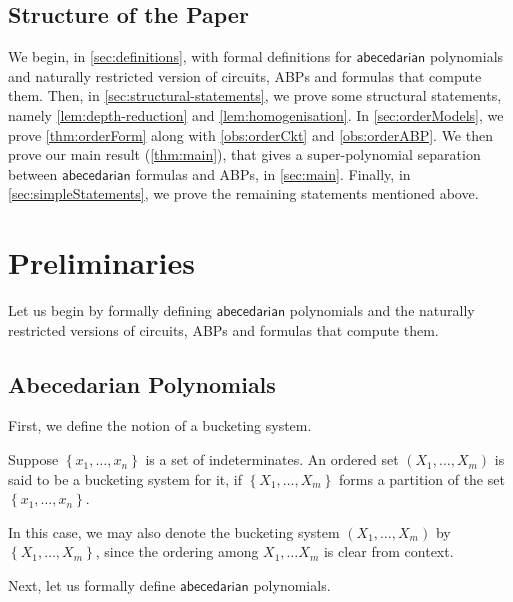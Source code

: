 \documentclass[10pt,a4paper]{article}
\def\set#1{\left\{ #1 \right\}}
\newcommand{\abcd}{\mathsf{abecedarian}}
\begin{document}
\subsection{Structure of the Paper}

We begin, in \autoref{sec:definitions}, with formal definitions for $\abcd$ polynomials and naturally restricted version of circuits, ABPs and formulas that compute them.
Then, in \autoref{sec:structural-statements}, we prove some structural statements, namely \autoref{lem:depth-reduction} and \autoref{lem:homogenisation}.
In \autoref{sec:orderModels}, we prove \autoref{thm:orderForm} along with \autoref{obs:orderCkt} and \autoref{obs:orderABP}.
We then prove our main result (\autoref{thm:main}), that gives a super-polynomial separation between $\abcd$ formulas and ABPs, in \autoref{sec:main}.
Finally, in \autoref{sec:simpleStatements}, we prove the remaining statements mentioned above.

%


\section{Preliminaries}\label{sec:definitions}

Let us begin by formally defining $\abcd$ polynomials and the naturally restricted versions of circuits, ABPs and formulas that compute them.

\subsection{Abecedarian Polynomials}\label{sec:defn_abcd_poly}

First, we define the notion of a bucketing system.

\begin{definition}
	Suppose $\set{x_1, \ldots, x_n}$ is a set of indeterminates.
	An ordered set $(X_1, \ldots, X_m)$ is said to be a bucketing system for it, if $\set{X_1, \ldots, X_m}$ forms a partition of the set $\set{x_1, \ldots, x_n}$.

	In this case, we may also denote the bucketing system $(X_1, \ldots, X_m)$ by $\set{X_1, \ldots, X_m}$, since the ordering among $X_1, \ldots X_m$ is clear from context.	
\end{definition}

\noindent Next, let us formally define $\abcd$ polynomials. 
\end{document}
